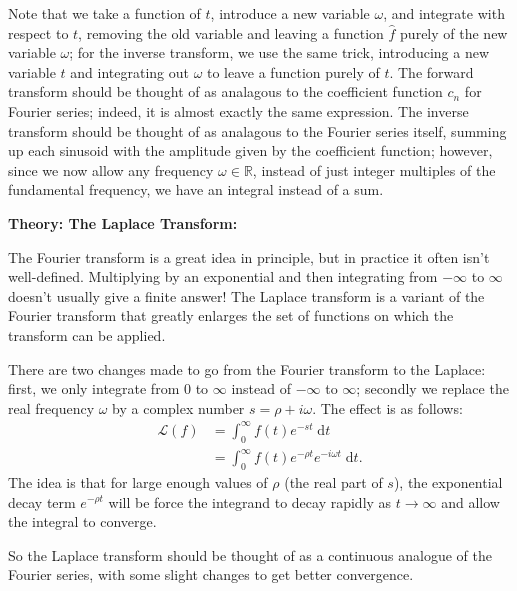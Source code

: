 \documentclass{article}
\newcommand{\diff}{\;\mathrm{d}}
\begin{document}
Note that we take a function of $t$, introduce a new variable $\omega$, and integrate with respect to $t$, removing the old variable and leaving a function $\hat{f}$ purely of the new variable $\omega$; for the inverse transform, we use the same trick, introducing a new variable $t$ and integrating out $\omega$ to leave a function purely of $t$. The forward transform should be thought of as analagous to the coefficient function $c_n$ for Fourier series; indeed, it is almost exactly the same expression. The inverse transform should be thought of as analagous to the Fourier series itself, summing up each sinusoid with the amplitude given by the coefficient function; however, since we now allow any frequency $\omega\in \mathbb{R}$, instead of just integer multiples of the fundamental frequency, we have an integral instead of a sum.\bigskip



\textbf{Theory: The Laplace Transform:}\bigskip

The Fourier transform is a great idea in principle, but in practice it often isn't well-defined. Multiplying by an exponential and then integrating from $-\infty$ to $\infty$ doesn't usually give a finite answer! The Laplace transform is a variant of the Fourier transform that greatly enlarges the set of functions on which the transform can be applied.

There are two changes made to go from the Fourier transform to the Laplace: first, we only integrate from 0 to $\infty$ instead of $-\infty$ to $\infty$; secondly we replace the real frequency $\omega$ by a complex number $s=\rho + i \omega$. The effect is as follows:
\begin{align*}
	\mathcal{L}(f)&=\int_0^\infty f(t)e^{-st}\diff t\\
	&= \int_0^\infty f(t)e^{-\rho t}e^{-i\omega t}\diff t.
\end{align*}
The idea is that for large enough values of $\rho$ (the real part of $s$), the exponential decay term $e^{-\rho t}$ will be force the integrand to decay rapidly as $t\to \infty$ and allow the integral to converge.

So the Laplace transform should be thought of as a continuous analogue of the Fourier series, with some slight changes to get better convergence.
\end{document}
